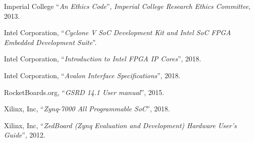 \begin{thebibliography}{1}
  Imperial College
  ``\textit{An Ethics Code}'',
  \textit{Imperial College Research Ethics Committee},
  2013.

  Intel Corporation,
  ``\textit{Cyclone V SoC Development Kit and Intel SoC FPGA Embedded
  Development Suite}''.

  Intel Corporation,
  ``\textit{Introduction to Intel FPGA IP Cores}'',
  2018.

  Intel Corporation,
  ``\textit{Avalon Interface Specifications}'',
  2018.

  RocketBoards.org,
  ``\textit{GSRD 14.1 User manual}'',
  2015.

  Xilinx, Inc,
  ``\textit{Zynq-7000 All Programmable SoC}'',
  2018.

  Xilinx, Inc,
  ``\textit{ZedBoard (Zynq Evaluation and Development) Hardware User's Guide}'',
  2012.
\end{thebibliography}